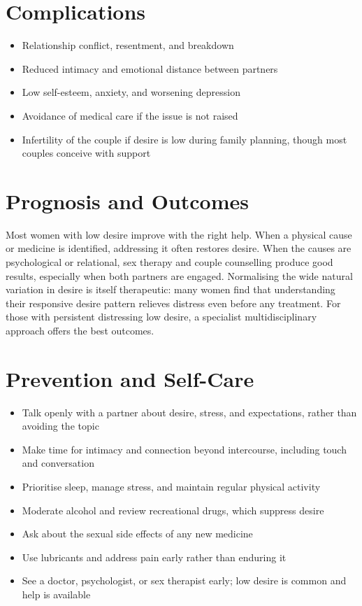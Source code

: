 \section*{Complications}
\begin{itemize}
    \item Relationship conflict, resentment, and breakdown
    \item Reduced intimacy and emotional distance between partners
    \item Low self-esteem, anxiety, and worsening depression
    \item Avoidance of medical care if the issue is not raised
    \item Infertility of the couple if desire is low during family planning, though most couples conceive with support
\end{itemize}

\section*{Prognosis and Outcomes}
Most women with low desire improve with the right help. When a physical cause or medicine is identified, addressing it often restores desire. When the causes are psychological or relational, sex therapy and couple counselling produce good results, especially when both partners are engaged. Normalising the wide natural variation in desire is itself therapeutic: many women find that understanding their responsive desire pattern relieves distress even before any treatment. For those with persistent distressing low desire, a specialist multidisciplinary approach offers the best outcomes.

\section*{Prevention and Self-Care}
\begin{itemize}
    \item Talk openly with a partner about desire, stress, and expectations, rather than avoiding the topic
    \item Make time for intimacy and connection beyond intercourse, including touch and conversation
    \item Prioritise sleep, manage stress, and maintain regular physical activity
    \item Moderate alcohol and review recreational drugs, which suppress desire
    \item Ask about the sexual side effects of any new medicine
    \item Use lubricants and address pain early rather than enduring it
    \item See a doctor, psychologist, or sex therapist early; low desire is common and help is available
\end{itemize}

